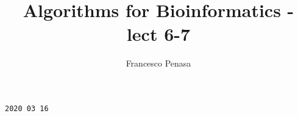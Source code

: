 \documentclass[11pt]{article}
\begin{document}
\author{Francesco Penasa}
\title{Algorithms for Bioinformatics - lect 6-7}
\maketitle

\medskip

\texttt{2020 03 16}
\end{document}
